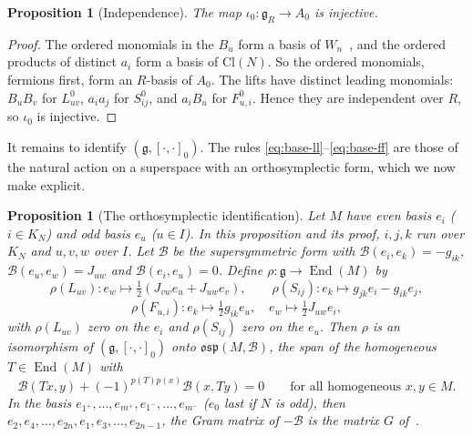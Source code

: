 \documentclass[11pt]{article}
\numberwithin{equation}{section}
\newtheorem{proposition}[theorem]{Proposition}
\theoremstyle{definition}
\theoremstyle{remark}
\newcommand{\osp}{\mathfrak{osp}}
\begin{document}
\begin{proposition}[Independence]\label{prop:independence}
The map $\iota_0\colon\mathfrak g_R\to A_0$ is injective.
\end{proposition}

\begin{proof}
The ordered monomials in the $B_u$ form a basis of $W_n$~\cite[proof of Lemma~2.3]{Aoi26}, and the
ordered products of distinct $a_i$ form a basis of $\mathrm{Cl}(N)$. So the ordered monomials, fermions first,
form an $R$-basis of $A_0$. The lifts have distinct leading monomials: $B_uB_v$ for
$L^0_{uv}$, $a_ia_j$ for $S^0_{ij}$, and $a_iB_u$ for $F^0_{u,i}$. Hence they are
independent over $R$, so $\iota_0$ is injective.
\end{proof}

It remains to identify $(\mathfrak g,[\cdot,\cdot]_0)$. The rules
\eqref{eq:base-ll}--\eqref{eq:base-ff} are those of the natural action on a superspace with
an orthosymplectic form, which we now make explicit.

\begin{proposition}[The orthosymplectic identification]\label{prop:osp}
Let $M$ have even basis $e_i$ ($i\in K_N$) and odd basis $e_u$ ($u\in I$). In this
proposition and its proof, $i,j,k$ run over $K_N$ and $u,v,w$ over $I$. Let
$\mathcal B$ be the supersymmetric form with $\mathcal B(e_i,e_k)=-g_{ik}$,
$\mathcal B(e_u,e_w)=J_{uw}$ and $\mathcal B(e_i,e_u)=0$. Define $\rho\colon\mathfrak g\to
\operatorname{End}(M)$ by
\[
 \rho(L_{uv})\colon e_w\mapsto\tfrac12(J_{vw}e_u+J_{uw}e_v),\qquad
 \rho(S_{ij})\colon e_k\mapsto g_{jk}e_i-g_{ik}e_j,
\]
\[
 \rho(F_{u,i})\colon e_k\mapsto\tfrac12g_{ik}e_u,\quad e_w\mapsto\tfrac12J_{uw}e_i,
\]
with $\rho(L_{uv})$ zero on the $e_i$ and $\rho(S_{ij})$ zero on the $e_u$. Then $\rho$
is an isomorphism of $(\mathfrak g,[\cdot,\cdot]_0)$ onto $\osp(M,\mathcal B)$, the span of the
homogeneous $T\in\operatorname{End}(M)$ with
\[
 \mathcal B(Tx,y)+(-1)^{p(T)p(x)}\mathcal B(x,Ty)=0\qquad\text{for all homogeneous }x,y\in M.
\]
In the basis $e_{1^+},\ldots,e_{m^+},e_{1^-},\ldots,e_{m^-}$ ($e_0$ last if $N$ is odd),
then $e_2,e_4,\ldots,e_{2n},e_1,e_3,\ldots,e_{2n-1}$, the Gram matrix of $-\mathcal B$ is
the matrix $G$ of~\cite[\S2.27]{FSS00}.
\end{proposition}
\end{document}
